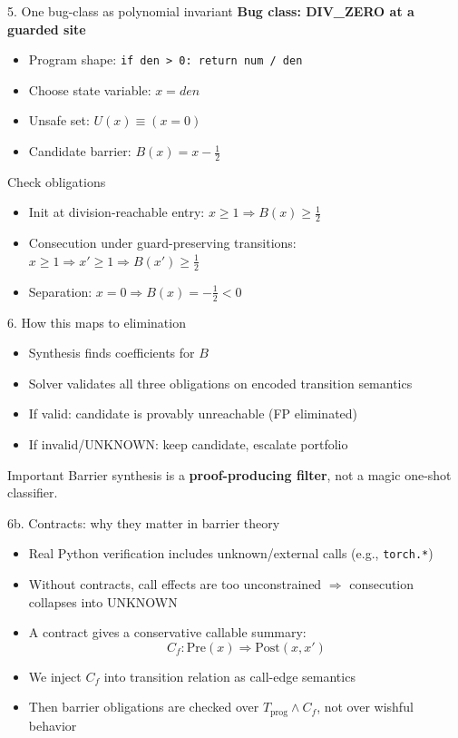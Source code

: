\documentclass[aspectratio=169]{beamer}
\begin{document}
\begin{frame}{5. One bug-class as polynomial invariant}
\textbf{Bug class: DIV\_ZERO at a guarded site}
\begin{itemize}
  \item Program shape: \texttt{if den > 0: return num / den}
  \item Choose state variable: \(x = den\)
  \item Unsafe set: \(U(x) \equiv (x=0)\)
  \item Candidate barrier: \(B(x)=x-\tfrac{1}{2}\)
\end{itemize}
\begin{block}{Check obligations}
\begin{itemize}
  \item Init at division-reachable entry: \(x\ge1 \Rightarrow B(x)\ge\tfrac{1}{2}\)
  \item Consecution under guard-preserving transitions: \(x\ge1\Rightarrow x'\ge1\Rightarrow B(x')\ge\tfrac{1}{2}\)
  \item Separation: \(x=0\Rightarrow B(x)=-\tfrac{1}{2}<0\)
\end{itemize}
\end{block}
\end{frame}

\begin{frame}{6. How this maps to elimination}
\begin{itemize}
  \item Synthesis finds coefficients for \(B\)
  \item Solver validates all three obligations on encoded transition semantics
  \item If valid: candidate is provably unreachable (FP eliminated)
  \item If invalid/UNKNOWN: keep candidate, escalate portfolio
\end{itemize}
\begin{block}{Important}
Barrier synthesis is a \textbf{proof-producing filter}, not a magic one-shot classifier.
\end{block}
\end{frame}

\begin{frame}{6b. Contracts: why they matter in barrier theory}
\begin{itemize}
  \item Real Python verification includes unknown/external calls (e.g., \texttt{torch.*})
  \item Without contracts, call effects are too unconstrained \(\Rightarrow\) consecution collapses into UNKNOWN
  \item A contract gives a conservative callable summary:
  \[
  C_f: \text{Pre}(x)\Rightarrow \text{Post}(x,x')
  \]
  \item We inject \(C_f\) into transition relation as call-edge semantics
  \item Then barrier obligations are checked over \(T_{\text{prog}}\land C_f\), not over wishful behavior
\end{itemize}
\end{frame}
\end{document}
